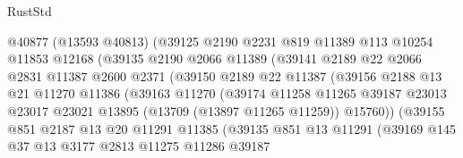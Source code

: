 \begin{lexlean}{RustStd}
\begin{coremodule}
                        @40877
                        (@13593 @40813)
                        (@39125
                          @2190
                          @2231
                          @819
                          @11389
                          @113
                          @10254
                          @11853
                          @12168
                          (@39135
                            @2190
                            @2066
                            @11389
                            (@39141
                              @2189
                              @22
                              @2066
                              @2831
                              @11387
                              @2600
                              @2371
                              (@39150
                                @2189
                                @22
                                @11387
                                (@39156
                                  @2188
                                  @13
                                  @21
                                  @11270
                                  @11386
                                  (@39163
                                    @11270
                                    (@39174
                                      @11258
                                      @11265
                                      @39187
                                      @23013
                                      @23017
                                      @23021
                                      @13895
                                      (@13709 (@13897 @11265 @11259))
                                      @15760))
                                  (@39155
                                    @851
                                    @2187
                                    @13
                                    @20
                                    @11291
                                    @11385
                                    (@39135
                                      @851
                                      @13
                                      @11291
                                      (@39169
                                        @145
                                        @37
                                        @13
                                        @3177
                                        @2813
                                        @11275
                                        @11286
                                        @39187

\end{coremodule}
\end{lexlean}
